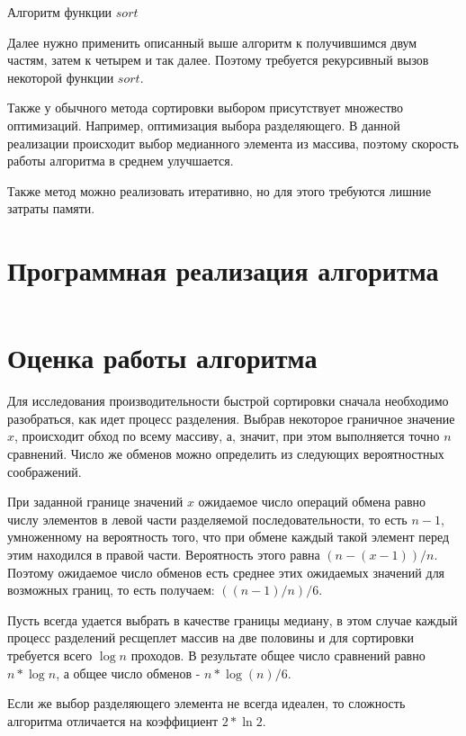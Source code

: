 \documentclass[bachelor, och, labwork]{shiza}
\begin{document}
\begin{center}Алгоритм функции $sort$\end{center}

Далее нужно применить описанный выше алгоритм к получившимся двум частям, затем 
к четырем и так далее. Поэтому требуется рекурсивный вызов некоторой функции 
$sort$.

Также у обычного метода сортировки выбором присутствует множество оптимизаций. 
Например, оптимизация выбора разделяющего. В данной реализации происходит выбор 
медианного элемента из массива, поэтому скорость работы алгоритма в среднем 
улучшается.

Также метод можно реализовать итеративно, но для этого требуются лишние затраты
памяти.


\section{Программная реализация алгоритма}

\inputminted[linenos,breaklines=true, fontsize=\small, style=bw]{python}{qs.py}

\section{Оценка работы алгоритма}

Для исследования производительности быстрой сортировки сначала необходимо
разобраться, как идет процесс разделения. Выбрав некоторое граничное значение
$x$, происходит обход по всему массиву, а, значит, при этом выполняется точно
$n$ сравнений. Число же обменов можно определить из следующих
вероятностных соображений.

При заданной границе значений $x$ ожидаемое число операций обмена равно числу 
элементов в левой части разделяемой последовательности, то есть $n-1$,
умноженному на вероятность того, что при обмене каждый такой элемент перед этим
находился в правой части. Вероятность этого равна $(n-(x-1))/n$. Поэтому 
ожидаемое число обменов есть среднее этих ожидаемых значений для возможных
границ, то есть получаем: $((n-1)/n)/6$.

Пусть всегда удается выбрать в качестве границы медиану, в этом случае каждый 
процесс разделений ресщеплет массив на две половины и для сортировки требуется
всего $\log n$ проходов. В результате общее число сравнений равно $n*\log n$,
а общее число обменов - $n * \log (n)/6$.

Если же выбор разделяющего элемента не всегда идеален, то сложность алгоритма
отличается на коэффициент $2* \ln 2$.
\end{document}

